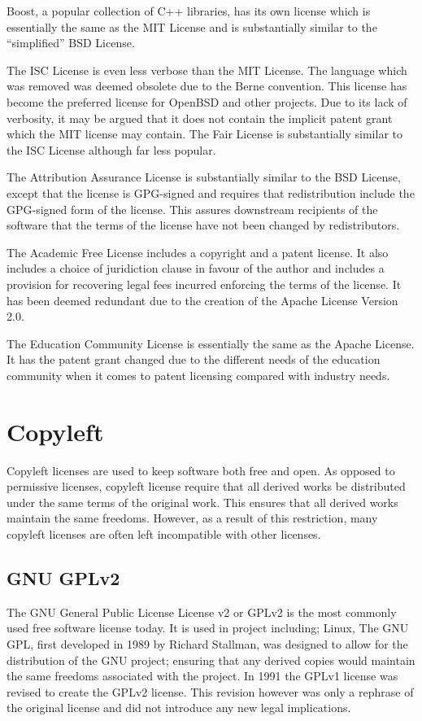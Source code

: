 \documentclass[12pt,letterpaper]{article}
\begin{document}
Boost, a popular collection of C++ libraries, has its own license which is essentially the same as the MIT License and is substantially similar to the ``simplified'' BSD License.

The ISC License is even less verbose than the MIT License. The language which was removed was deemed obsolete due to the Berne convention. This license has become the preferred license for OpenBSD and other projects. Due to its lack of verbosity, it may be argued that it does not contain the implicit patent grant which the MIT license may contain. The Fair License is substantially similar to the ISC License although far less popular.

The Attribution Assurance License is substantially similar to the BSD License, except that the license is GPG-signed and requires that redistribution include the GPG-signed form of the license. This assures downstream recipients of the software that the terms of the license have not been changed by redistributors.

The Academic Free License includes a copyright and a patent license. It also includes a choice of juridiction clause in favour of the author and includes a provision for recovering legal fees incurred enforcing the terms of the license. It has been deemed redundant due to the creation of the Apache License Version 2.0.

The Education Community License is essentially the same as the Apache License. It has the patent grant changed due to the different needs of the education community when it comes to patent licensing compared with industry needs.

\section{Copyleft}

Copyleft licenses are used to keep software both free and open. As opposed to permissive licenses, copyleft license require that all derived works be distributed under the same terms of the original work. This ensures that all derived works maintain the same freedoms. However, as a result of this restriction, many copyleft licenses are often left incompatible with other licenses. \cite{copyleft}

\subsection{GNU GPLv2}

The GNU General Public License License v2 or GPLv2 is the most commonly used free software license today. It is used in project including; Linux, The GNU GPL, first developed in 1989 by Richard Stallman, was designed to allow for the distribution of the GNU project; ensuring that any derived copies would maintain the same freedoms associated with the project. In 1991 the GPLv1 license was revised to create the GPLv2 license. This revision however was only a rephrase of the original license and did not introduce any new legal implications.
\end{document}
